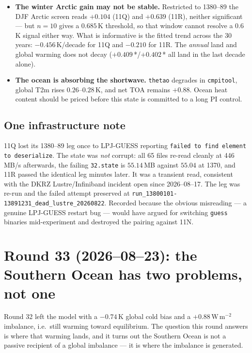 \documentclass[10pt]{article}
\begin{document}
\begin{itemize}\itemsep1pt
\item \textbf{The winter Arctic gain may not be stable.} Restricted to 1380--89 the DJF
Arctic screen reads $+0.104$ (11Q) and $+0.639$ (11R), neither significant --- but $n{=}10$
gives a $0.685$\,K threshold, so that window cannot resolve a $0.6$\,K signal either way.
What is informative is the fitted trend across the 30 years: $-0.456$\,K/decade for 11Q and
$-0.210$ for 11R. The \emph{annual} land and global warming does not decay
($+0.409$\,*/$+0.402$\,* all land in the last decade alone).
\item \textbf{The ocean is absorbing the shortwave.} \texttt{thetao} degrades in
\texttt{cmpitool}, global T2m rises $0.26$--$0.28$\,K, and net TOA remains $+0.88$. Ocean
heat content should be priced before this state is committed to a long PI control.
\end{itemize}

\subsection{One infrastructure note}\label{sub:r32infra}

11Q lost its 1380--89 leg once to LPJ-GUESS reporting \texttt{failed to find element to
deserialize}. The state was \emph{not} corrupt: all 65 files re-read cleanly at
446\,MB/s afterwards, the failing \texttt{32.state} is $55.14$\,MB against $55.04$ at
1370, and 11R passed the identical leg minutes later. It was a transient read, consistent
with the DKRZ Lustre/Infiniband incident open since 2026--08--17. The leg was re-run and
the failed attempt preserved at \texttt{run\_13800101-13891231\_dead\_lustre\_20260822}.
Recorded because the obvious misreading --- a genuine LPJ-GUESS restart bug --- would have
argued for switching \texttt{guess} binaries mid-experiment and destroyed the pairing
against 11N.

\section{Round 33 (2026--08--23): the Southern Ocean has two problems, not one}\label{sec:round33}

Round 32 left the model with a $-0.74$\,K global cold bias and a $+0.88$\,W\,m$^{-2}$
imbalance, i.e.\ still warming toward equilibrium. The question this round answers is
where that warming lands, and it turns out the Southern Ocean is not a passive recipient
of a global imbalance --- it is where the imbalance is generated.
\end{document}
